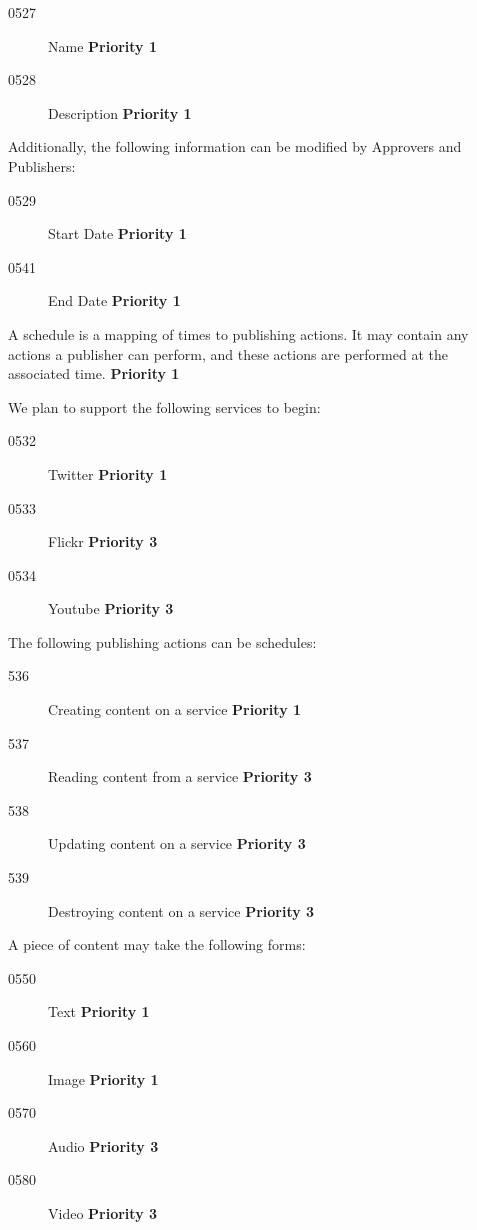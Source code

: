 \documentclass{article}
\begin{document}
\begin{description}
\begin{description}
  \begin{description}
  \item[0527]Name \textbf{Priority 1}
  \item[0528]Description \textbf{Priority 1}
  \end{description}

\item Additionally, the following information can be modified by Approvers
  and Publishers:
  \begin{description}
  \item[0529]Start Date \textbf{Priority 1}
  \item[0541]End Date \textbf{Priority 1}
  \end{description}

\item[0530] A schedule is a mapping of times to publishing actions. It may
  contain any actions a publisher can perform, and these actions are
  performed at the associated time. \textbf{Priority 1}

\item[0531] We plan to support the following services to begin:
  \begin{description}
  \item[0532] Twitter \textbf{Priority 1}
  \item[0533] Flickr \textbf{Priority 3}
  \item[0534] Youtube \textbf{Priority 3}
  \end{description}     

\item[0535] The following publishing actions can be schedules:
  \begin{description}
  \item[536] Creating content on a service \textbf{Priority 1}
  \item[537] Reading content from a service \textbf{Priority 3}
  \item[538] Updating content on a service \textbf{Priority 3}
  \item[539] Destroying content on a service \textbf{Priority 3}
  \end{description}

\item[0540] A piece of content may take the following forms:
\begin{description}
\item[0550] Text \textbf{Priority 1}
\item[0560] Image \textbf{Priority 1}
\item[0570] Audio \textbf{Priority 3}
\item[0580] Video \textbf{Priority 3}
\end{description}


\end{description}
\end{description}
\end{document}
